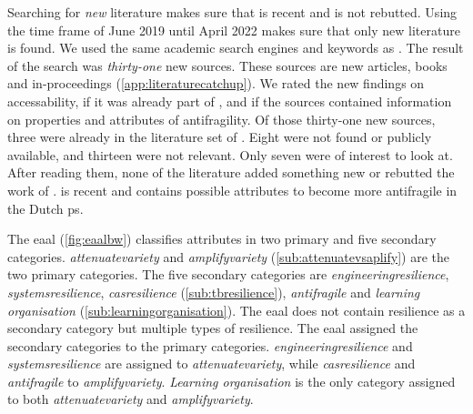 Searching for \textit{new} literature makes sure that \textcite{Botjes2021} is recent and is not rebutted. Using the time frame of June 2019 until April 2022 makes sure that only new literature is found. We used the same academic search engines and keywords as \textcite[p.~5]{Botjes2021}. The result of the search was \textit{thirty-one} new sources. These sources are new articles, books and in-proceedings (\cref{app:literaturecatchup}). We rated the new findings on accessability, if it was already part of \textcite{Botjes2021}, and if the sources contained information on properties and attributes of \gls{antifragility}. Of those thirty-one new sources, three were already in the literature set of \textcite{Botjes2021}. Eight were not found or publicly available, and thirteen were not relevant. Only seven were of interest to look at. After reading them, none of the literature added something new or rebutted the work of \textcite{Botjes2021}. \textcite{Botjes2021} is recent and contains possible \glspl{attribute} to become more \gls{antifragile} in the Dutch \gls{ps}.

The \acrlong{eaal} (\cref{fig:eaalbw}) classifies \glspl{attribute} in two primary and five secondary categories. \textit{\Gls{attenuatevariety}} and \textit{\gls{amplifyvariety}} (\cref{sub:attenuatevsaplify}) are the two primary categories. The five secondary categories are \textit{\gls{engineeringresilience}}, \textit{\gls{systemsresilience}}, \textit{\gls{casresilience}} (\cref{sub:tbresilience}), \textit{\gls{antifragile}} and \textit{learning organisation} (\cref{sub:learningorganisation}). The \acrlong{eaal} does not contain resilience as a secondary category but multiple types of resilience. The \acrlong{eaal} assigned the secondary categories to the primary categories. \textit{\Gls{engineeringresilience}} and \textit{\gls{systemsresilience}} are assigned to \textit{\gls{attenuatevariety}}, while \textit{\gls{casresilience}} and \textit{\gls{antifragile}} to \textit{\gls{amplifyvariety}}. \textit{Learning organisation} is the only category assigned to both \textit{\gls{attenuatevariety}} and \textit{\gls{amplifyvariety}}.
